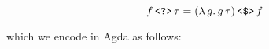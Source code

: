 \documentclass[authoryear, acmsmall, screen, review, nonacm]{acmart}
\begin{document}
\[
f\, \verb!<?>!\, \tau = (\lambda\, g.\, g \, \tau) \, \verb!<$>!\, f
\]

\Ni which we encode in Agda as follows:

\begin{code}%
\>[0]\AgdaSpace{}%
\AgdaSymbol{:}\AgdaSpace{}%
\AgdaSpace{}%
\AgdaSpace{}%
\AgdaSymbol{(}\AgdaOperator{\AgdaInductiveConstructor{R[}}\AgdaSpace{}%
\AgdaSpace{}%
\AgdaSpace{}%
\AgdaSpace{}%
\AgdaOperator{\AgdaInductiveConstructor{]}}\AgdaSpace{}%
\AgdaSpace{}%
\AgdaSpace{}%
\AgdaSpace{}%
\AgdaOperator{\AgdaInductiveConstructor{R[}}\AgdaSpace{}%
\AgdaSpace{}%
\AgdaOperator{\AgdaInductiveConstructor{]}}\AgdaSymbol{)}\<%
\\
\>[0]\AgdaSpace{}%
\AgdaSymbol{=}\AgdaSpace{}%
\AgdaSpace{}%
\AgdaSymbol{(}\AgdaSpace{}%
\AgdaSymbol{((}\AgdaSpace{}%
\AgdaSymbol{((}\AgdaSpace{}%
\AgdaSymbol{)}\AgdaSpace{}%
\AgdaSpace{}%
\AgdaSymbol{(}\AgdaSpace{}%
\AgdaSymbol{(}\AgdaSpace{}%
\AgdaSymbol{))))}\AgdaSpace{}%
\AgdaOperator{\AgdaInductiveConstructor{<\$>}}\AgdaSpace{}%
\AgdaSymbol{(}\AgdaSpace{}%
\AgdaSymbol{(}\AgdaSpace{}%
\AgdaSymbol{))))}\<%
\\
%
\\[\AgdaEmptyExtraSkip]%
\>[0]\AgdaSpace{}%
\AgdaSymbol{:}\AgdaSpace{}%
\AgdaSpace{}%
\AgdaSpace{}%
\AgdaSymbol{(}\AgdaOperator{\AgdaInductiveConstructor{R[}}\AgdaSpace{}%
\AgdaSpace{}%
\AgdaSpace{}%
\AgdaSpace{}%
\AgdaOperator{\AgdaInductiveConstructor{]}}\AgdaSymbol{)}\AgdaSpace{}%
\AgdaSpace{}%
\AgdaSpace{}%
\AgdaSpace{}%
\AgdaSpace{}%
\AgdaSpace{}%
\AgdaSpace{}%
\AgdaSpace{}%
\AgdaOperator{\AgdaInductiveConstructor{R[}}\AgdaSpace{}%
\AgdaSpace{}%
\AgdaOperator{\AgdaInductiveConstructor{]}}\<%
\\
\>[0]\AgdaSpace{}%
\AgdaSpace{}%
\AgdaSpace{}%
\AgdaSymbol{=}\AgdaSpace{}%
\AgdaSpace{}%
\AgdaSpace{}%
\AgdaSpace{}%
\AgdaSpace{}%
\<%
\end{code}
\end{document}
